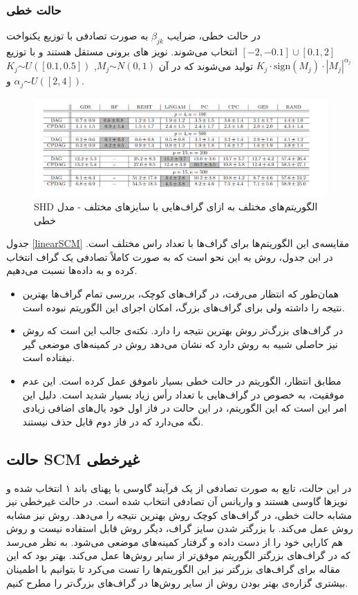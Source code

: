 \documentclass[a4paper,12pt]{article}
\begin{document}
\subsubsection{
حالت
خطی
}
در حالت خطی، ضرایب 
 $\beta_{jk}$
 به صورت تصادفی با توزیع یکنواخت 
 $[-2,-0.1] \cup [0.1,2]$
 انتخاب می‌شوند. نویز های برونی مستقل هستند و با توزیع 
 $K_j \cdot \mathrm{sign}(M_j)\cdot |M_j|^{\alpha_j}$
 تولید می‌شوند که در آن
 $M_j \stackrel{}{\sim} N(0,1)$, $K_j \stackrel{}{\sim} U([0.1,0.5])$ 
 و
  $\alpha_j \stackrel{}{\sim} U([2,4])$. 
\begin{figure}[h!]
	\centering
	\includegraphics[scale=0.42]{linear.png}
	\caption{SHD
الگوریتم‌های مختلف به ازای گراف‌هایی با سایز‌های مختلف	 - مدل خطی
}
\label{linearSCM}
\end{figure}
جدول  \eqref{linearSCM} مقایسه‌ی 
این الگوریتم‌ها برای گراف‌ها با تعداد راس مختلف است. 
در این جدول، روش 
به این نحو است که به صورت کاملاً تصادفی یک گراف انتخاب کرده و به داده‌ها نسبت می‌دهیم. 
\begin{itemize}
\item 
همان‌طور که انتظار می‌رفت، در گراف‌های کوچک، بررسی تمام گراف‌ها بهترین نتیجه را داشته ولی برای گراف‌های بزرگ، امکان اجرای این الگوریتم نبوده است.
\item 
در گراف‌های بزرگ‌تر روش 
بهترین نتیجه را دارد. نکته‌ی جالب این است که روش 
نیز حاصلی شبیه به روش 
دارد که نشان می‌دهد روش 
 در کمینه‌های موضعی گیر نیفتاده است.
 \item 
 مطابق انتظار، الگوریتم
 در حالت خطی بسیار ناموفق عمل کرده است. این عدم موفقیت، به خصوص در گراف‌هایی با تعداد رأس زیاد بسیار شدید است. دلیل این امر این است که این الگوریتم، در این حالت در فاز اول خود یال‌های اضافی زیادی نگه می‌دارد که در فاز دوم قابل حذف نیستند.

\end{itemize}

\subsection{حالت 
SCM
غیرخطی
}
در این حالت، تابع به صورت تصادفی از  یک فرآیند گاوسی با پهنای باند ۱ انتخاب شده و نویز‌ها گاوسی هستند و واریانس آن تصادفی انتخاب شده است.
در حالت غیرخطی نیز مشابه حالت خطی، در گراف‌های کوچک روش 
بهترین نتیجه را می‌دهد. روش 
نیز مشابه روش 
عمل می‌کند. با بزرگتر شدن سایز گراف، دیگر روش 
قابل استفاده نیست و روش
هم کارایی خود را از دست داده و گرفتار کمینه‌های موضعی می‌شود. به نظر می‌رسد که در گراف‌های بزرگتر الگوریتم
موفق‌تر از سایر روش‌ها عمل می‌کند. بهتر بود که این مقاله برای گراف‌های بزرگتر نیز این الگوریتم‌ها را تست می‌کرد تا بتوانیم با اطمینان بیشتری گزاره‌ی بهتر بودن روش 
از سایر روش‌ها در گراف‌های بزرگ‌تر را مطرح کنیم.
\end{document}
